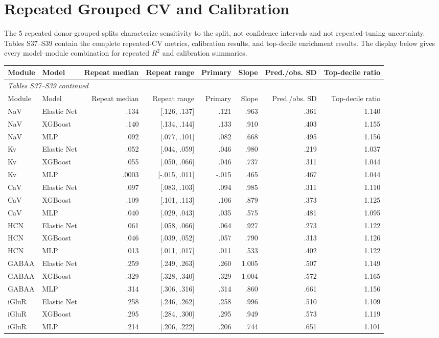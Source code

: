 \documentclass[11pt]{article}
\newcommand{\tablefont}{\fontsize{9.5}{11.2}\selectfont}
\newcommand{\sourcecaption}[1]{\Needspace{10\baselineskip}\vspace{2pt}{\small\bfseries #1}\par\vspace{2pt}}
\begin{document}
\section{Repeated Grouped CV and Calibration}
The 5 repeated donor-grouped splits characterize sensitivity to the split, not confidence intervals and not repeated-tuning uncertainty. Tables S37--S39 contain the complete repeated-CV metrics, calibration results, and top-decile enrichment results. The display below gives every model--module combination for repeated $R^2$ and calibration summaries.

\sourcecaption{Repeated donor-grouped CV, calibration, and top-decile enrichment (Tables S37--S39).}
{\tablefont
\setlength{\tabcolsep}{2.8pt}
\begin{longtable}{@{}llrrrrrr@{}}
\toprule
Module & Model & Repeat median & Repeat range & Primary & Slope & Pred./obs. SD & Top-decile ratio \\
\midrule
\endfirsthead
\multicolumn{8}{l}{\small\itshape Tables S37--S39 continued}\\[2pt]
\toprule
Module & Model & Repeat median & Repeat range & Primary & Slope & Pred./obs. SD & Top-decile ratio \\
\midrule
\endhead
NaV & Elastic Net & .134 & [.126, .137] & .121 & .963 & .361 & 1.140 \\
NaV & XGBoost & .140 & [.134, .144] & .133 & .910 & .403 & 1.155 \\
NaV & MLP & .092 & [.077, .101] & .082 & .668 & .495 & 1.156 \\
Kv & Elastic Net & .052 & [.044, .059] & .046 & .980 & .219 & 1.037 \\
Kv & XGBoost & .055 & [.050, .066] & .046 & .737 & .311 & 1.044 \\
Kv & MLP & .0003 & [-.015, .011] & -.015 & .465 & .467 & 1.044 \\
CaV & Elastic Net & .097 & [.083, .103] & .094 & .985 & .311 & 1.110 \\
CaV & XGBoost & .109 & [.101, .113] & .106 & .879 & .373 & 1.125 \\
CaV & MLP & .040 & [.029, .043] & .035 & .575 & .481 & 1.095 \\
HCN & Elastic Net & .061 & [.058, .066] & .064 & .927 & .273 & 1.122 \\
HCN & XGBoost & .046 & [.039, .052] & .057 & .790 & .313 & 1.126 \\
HCN & MLP & .013 & [.011, .017] & .011 & .533 & .402 & 1.122 \\
GABAA & Elastic Net & .259 & [.249, .263] & .260 & 1.005 & .507 & 1.149 \\
GABAA & XGBoost & .329 & [.328, .340] & .329 & 1.004 & .572 & 1.165 \\
GABAA & MLP & .314 & [.306, .316] & .314 & .860 & .661 & 1.156 \\
iGluR & Elastic Net & .258 & [.246, .262] & .258 & .996 & .510 & 1.109 \\
iGluR & XGBoost & .295 & [.284, .300] & .295 & .949 & .573 & 1.119 \\
iGluR & MLP & .214 & [.206, .222] & .206 & .744 & .651 & 1.101 \\
\bottomrule
\end{longtable}}
\end{document}
